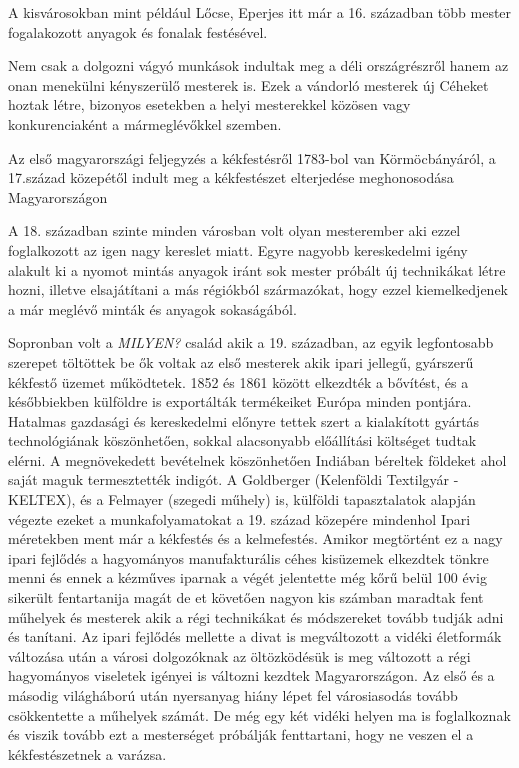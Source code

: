 \documentclass[fontsize=12pt, appendixprefix=true]{scrreprt}
\begin{document}
A kisvárosokban mint például Lőcse, Eperjes itt már a 16. században több mester  fogalakozott anyagok és fonalak  festésével. 

Nem csak a dolgozni vágyó munkások indultak meg a déli országrészről hanem az onan menekülni kényszerülő mesterek is. Ezek a vándorló mesterek új Céheket hoztak létre, bizonyos esetekben a helyi mesterekkel közösen vagy konkurenciaként a mármeglévőkkel szemben. 

Az első magyarországi feljegyzés a kékfestésről 1783-bol van Körmöcbányáról, a 17.század közepétől indult meg a kékfestészet elterjedése meghonosodása Magyarországon  %

A 18. században szinte minden városban volt olyan mesterember aki ezzel foglalkozott az igen nagy kereslet miatt. Egyre nagyobb kereskedelmi igény alakult ki a nyomot mintás anyagok iránt sok mester próbált új technikákat létre hozni, illetve  elsajátítani a más régiókból származókat, hogy ezzel kiemelkedjenek a már meglévő minták és anyagok sokaságából.

Sopronban volt a \textit{MILYEN?} család akik a 19. században, az egyik legfontosabb szerepet töltöttek be ők voltak az első mesterek akik ipari jellegű, gyárszerű  kékfestő üzemet működtetek.
1852 és 1861 között elkezdték a bővítést, és a későbbiekben külföldre is exportálták termékeiket Európa minden pontjára. Hatalmas gazdasági és kereskedelmi előnyre tettek szert a kialakított gyártás technológiának köszönhetően, sokkal alacsonyabb előállítási költséget tudtak elérni. A megnövekedett bevételnek köszönhetően Indiában béreltek földeket ahol saját maguk termesztették indigót.
A Goldberger (Kelenföldi Textilgyár - KELTEX), és a Felmayer (szegedi műhely) is, külföldi tapasztalatok alapján végezte ezeket a  munkafolyamatokat a 19. század közepére mindenhol Ipari méretekben ment már a kékfestés és a kelmefestés.
Amikor megtörtént ez a nagy ipari fejlődés a hagyományos manufakturális céhes kisüzemek elkezdtek tönkre menni és ennek a kézműves iparnak a végét jelentette még kőrű belül 100 évig sikerült fentartanija magát de et követően nagyon kis számban maradtak fent műhelyek és mesterek akik a régi technikákat és módszereket tovább tudják adni és tanítani.
Az ipari fejlődés mellette a divat is megváltozott a vidéki életformák változása után a városi dolgozóknak az öltözködésük is meg változott a régi hagyományos viseletek igényei is változni kezdtek Magyarországon.
Az első és a másodig világháború után nyersanyag hiány lépet fel városiasodás tovább csökkentette a műhelyek számát.
De még egy két vidéki helyen ma is foglalkoznak és viszik tovább ezt a mesterséget próbálják fenttartani, hogy ne veszen el a kékfestészetnek a varázsa.
\end{document}
